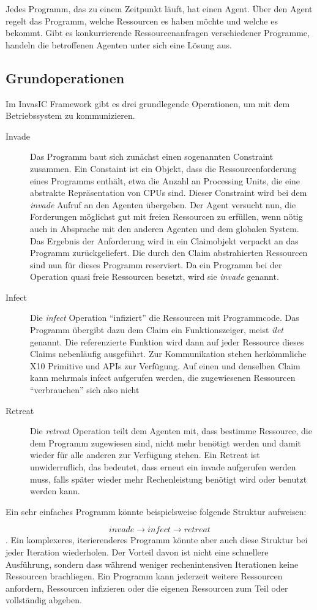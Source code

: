 Jedes Programm, das zu einem Zeitpunkt läuft, hat einen Agent. Über den Agent regelt das Programm, welche Ressourcen es haben möchte und welche es bekommt. Gibt es konkurrierende Ressourcenanfragen verschiedener Programme, handeln die betroffenen Agenten unter sich eine Lösung aus.
\subsection{Grundoperationen} %
\label{sub:grundoperationen}

Im InvasIC Framework gibt es drei grundlegende Operationen, um mit dem Betriebssystem zu kommunizieren.
\begin{description}
	\item[Invade] Das Programm baut sich zunächst einen sogenannten Constraint zusammen. Ein Constaint ist ein Objekt, dass die Ressourcenforderung eines Programms enthält, etwa die Anzahl an Processing Units, die eine abstrakte Repräsentation von CPUs sind. Dieser Constraint wird bei dem \textit{invade} Aufruf an den Agenten übergeben. Der Agent versucht nun, die Forderungen möglichst gut mit freien Ressourcen zu erfüllen, wenn nötig auch in Absprache mit den anderen Agenten und dem globalen System. Das Ergebnis der Anforderung wird in ein Claimobjekt verpackt an das Programm zurückgeliefert. Die durch den Claim abstrahierten Ressourcen sind nun für dieses Programm reserviert. Da ein Programm bei der Operation quasi freie Ressourcen besetzt, wird sie \textit{invade} genannt.
	\item[Infect] Die \textit{infect} Operation \enquote{infiziert} die Ressourcen mit Programmcode. Das Programm übergibt dazu dem Claim ein Funktionszeiger, meist \textit{ilet} genannt. Die referenzierte Funktion wird dann auf jeder Ressource dieses Claims nebenläufig ausgeführt. Zur Kommunikation stehen herkömmliche X10 Primitive und APIs zur Verfügung. Auf einen und denselben Claim kann mehrmals infect aufgerufen werden, die zugewiesenen Ressourcen "`verbrauchen"' sich also nicht
	\item[Retreat] Die \textit{retreat} Operation teilt dem Agenten mit, dass bestimme Ressource, die dem Programm zugewiesen sind, nicht mehr benötigt werden und damit wieder für alle anderen zur Verfügung stehen. Ein Retreat ist unwiderruflich, das bedeutet, dass erneut ein invade aufgerufen werden muss, falls später wieder mehr Rechenleistung benötigt wird oder benutzt werden kann.
\end{description}

Ein sehr einfaches Programm könnte beispielsweise folgende Struktur aufweisen:
\begin{tikzpicture}
	
\end{tikzpicture}
$$\mathit{invade}\rightarrow\mathit{infect}\rightarrow\mathit{retreat}$$.
Ein komplexeres, iterierenderes Programm könnte aber auch diese Struktur bei jeder Iteration wiederholen. Der Vorteil davon ist nicht eine schnellere Ausführung, sondern dass während weniger rechenintensiven Iterationen keine Ressourcen brachliegen. Ein Programm kann jederzeit weitere Ressourcen anfordern, Ressourcen infizieren oder die eigenen Ressourcen zum Teil oder vollständig abgeben. 
